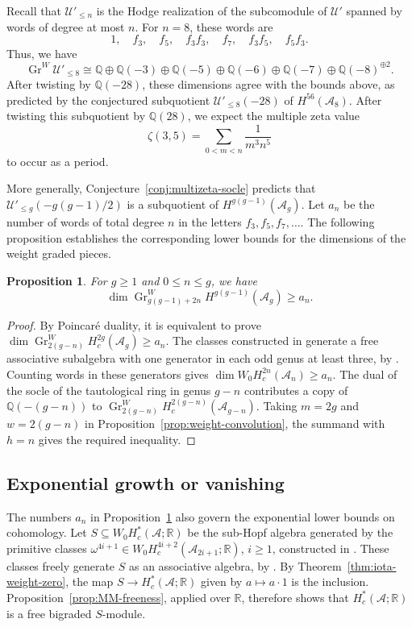 \documentclass[12 pt]{amsart}
\newcommand{\QQ}{\mathbb{Q}}
\newcommand{\RR}{\mathbb{R}}
\newcommand{\cA}{\mathcal{A}}
\newcommand{\cU}{\mathcal{U}}
\newcommand{\Gr}{\operatorname{Gr}}
\newcommand{\<}{\langle}
\renewcommand{\>}{\rangle}
\newtheorem{proposition}[theorem]{Proposition}
\theoremstyle{definition}
\begin{document}
Recall that $\cU'_{\leq n}$ is the Hodge realization of the subcomodule of $\cU'$ spanned by words of degree at most $n$. For $n = 8$, these words are
\[
1, \quad f_3, \quad f_5, \quad f_3 f_3, \quad f_7, \quad f_3 f_5, \quad f_5 f_3.
\]
Thus, we have
\[
\Gr^W \cU'_{\leq 8} \cong \QQ \oplus \QQ(-3) \oplus \QQ(-5) \oplus \QQ(-6) \oplus \QQ(-7) \oplus \QQ(-8)^{ \oplus 2}.
\]
After twisting by $\QQ(-28)$, these dimensions agree with the bounds above, as predicted by the conjectured subquotient $\cU'_{\leq 8}(-28)$ of $H^{56}(\cA_8)$. After twisting this subquotient by $\QQ(28)$, we expect the multiple zeta value
\[
\zeta(3, 5) = \sum_{0 < m < n} \frac{1}{m^3 n^5}
\]
to occur as a period.

More generally, Conjecture~\ref{conj:multizeta-socle} predicts that $\cU'_{\leq g}(-g(g - 1)/2)$ is a subquotient of $H^{g(g - 1)}(\cA_g)$. Let $a_n$ be the number of words of total degree $n$ in the letters $f_3, f_5, f_7, \ldots$. The following proposition establishes the corresponding lower bounds for the dimensions of the weight graded pieces.

\begin{proposition}\label{prop:multizeta-weight-bound}
For $g \geq 1$ and $0 \leq n \leq g$, we have
\[
\dim \Gr_{g(g - 1) + 2n}^W H^{g(g - 1)}(\cA_g) \geq a_n.
\]
\end{proposition}

\begin{proof}
By Poincar\'e duality, it is equivalent to prove $\dim \Gr_{2(g - n)}^W H_c^{2g}(\cA_g) \geq a_n$. The classes constructed in \cite{BCGP} generate a free associative subalgebra with one generator in each odd genus at least three, by \cite[Remark~1.3]{Willwacher26}. Counting words in these generators gives $\dim W_0 H_c^{2n}(\cA_n) \geq a_n$. The dual of the socle of the tautological ring in genus $g - n$ contributes a copy of $\QQ(-(g - n))$ to $\Gr_{2(g - n)}^W H_c^{2(g - n)}(\cA_{g - n})$. Taking $m = 2g$ and $w = 2(g - n)$ in Proposition~\ref{prop:weight-convolution}, the summand with $h = n$ gives the required inequality.
\end{proof}

\subsection{Exponential growth or vanishing}\label{sec:betti-exponential-growth}

The numbers $a_n$ in Proposition~\ref{prop:multizeta-weight-bound} also govern the exponential lower bounds on cohomology. Let $S \subseteq W_0 H_c^*(\cA; \RR)$ be the sub-Hopf algebra generated by the primitive classes $\omega^{4i + 1} \in W_0 H_c^{4i + 2}(\cA_{2i + 1}; \RR)$, $i \geq 1$, constructed in \cite{BCGP}. These classes freely generate $S$ as an associative algebra, by \cite[Remark~1.3]{Willwacher26}. By Theorem~\ref{thm:iota-weight-zero}, the map $S \to H_c^*(\cA; \RR)$ given by $a \mapsto a \cdot 1$ is the inclusion. Proposition~\ref{prop:MM-freeness}, applied over $\RR$, therefore shows that $H_c^*(\cA; \RR)$ is a free bigraded $S$-module.
\end{document}
